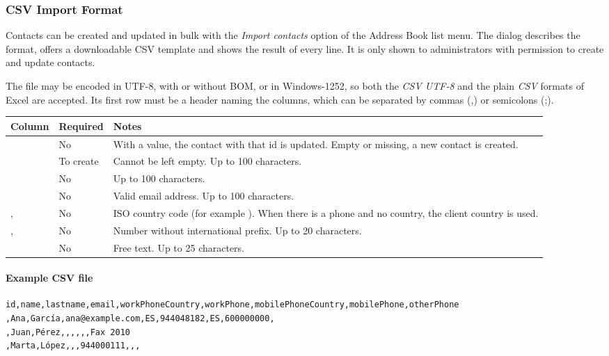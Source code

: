 \documentclass[letterpaper,10pt,english]{sphinxmanual}
\begin{document}
\subsubsection{CSV Import Format}
\label{administration_portal/client/vpbx/addressbook:csv-import-format}
Contacts can be created and updated in bulk with the \emph{Import contacts} option of the Address Book
list menu. The dialog describes the format, offers a downloadable CSV template and shows the result
of every line. It is only shown to administrators with permission to create and update contacts.

The file may be encoded in UTF-8, with or without BOM, or in Windows-1252, so both the \emph{CSV UTF-8} and the
plain \emph{CSV} formats of Excel are accepted. Its first row must be a header naming the columns, which can be
separated by commas (,) or semicolons (;).

\noindent\begin{tabulary}{\linewidth}{|L|L|L|}
\hline
\textsf{\relax 
Column
\unskip}\relax &\textsf{\relax 
Required
\unskip}\relax &\textsf{\relax 
Notes
\unskip}\relax \\
\hline
{}
&
No
&
With a value, the contact with that id is updated. Empty or missing, a new contact is created.
\\
\hline
{}
&
To create
&
Cannot be left empty. Up to 100 characters.
\\
\hline
{}
&
No
&
Up to 100 characters.
\\
\hline
{}
&
No
&
Valid email address. Up to 100 characters.
\\
\hline
{}, 
&
No
&
ISO country code (for example ). When there is a phone and no country, the client country
is used.
\\
\hline
{}, 
&
No
&
Number without international prefix. Up to 20 characters.
\\
\hline
{}
&
No
&
Free text. Up to 25 characters.
\\
\hline\end{tabulary}

\paragraph{Example CSV file}

\begin{Verbatim}[commandchars=\\\{\}]
id,name,lastname,email,workPhoneCountry,workPhone,mobilePhoneCountry,mobilePhone,otherPhone
,Ana,García,ana@example.com,ES,944048182,ES,600000000,
,Juan,Pérez,,,,,,Fax 2010
,Marta,López,,,944000111,,,
\end{Verbatim}
\end{document}
